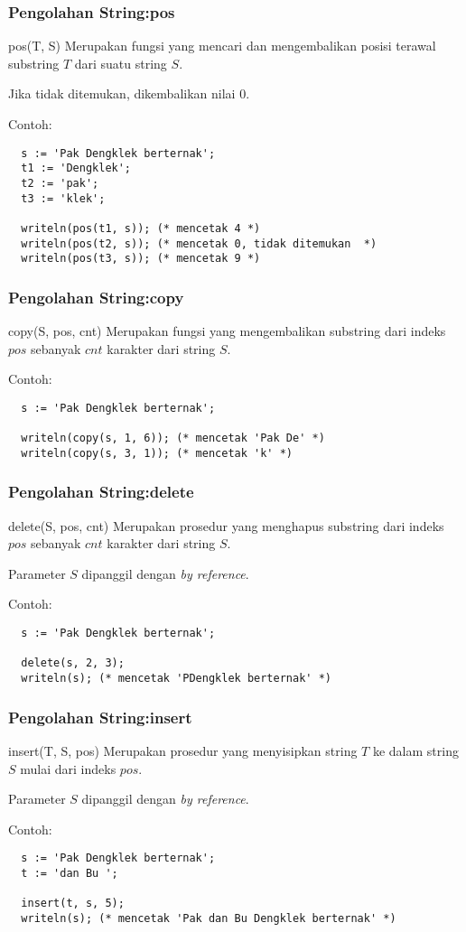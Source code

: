 \documentclass{beamer}
\begin{document}
\begin{frame}[fragile]
\frametitle{Pengolahan String:\newline pos}
\begin{block}{pos(T, S)}
Merupakan fungsi yang mencari dan mengembalikan posisi terawal substring $T$ dari suatu string $S$.

Jika tidak ditemukan, dikembalikan nilai 0.
\end{block}
Contoh:
\begin{lstlisting}
  s := 'Pak Dengklek berternak';
  t1 := 'Dengklek';
  t2 := 'pak';
  t3 := 'klek';

  writeln(pos(t1, s)); (* mencetak 4 *)
  writeln(pos(t2, s)); (* mencetak 0, tidak ditemukan  *)
  writeln(pos(t3, s)); (* mencetak 9 *)
\end{lstlisting}
\end{frame}

\begin{frame}[fragile]
\frametitle{Pengolahan String:\newline copy}
\begin{block}{copy(S, pos, cnt)}
Merupakan fungsi yang mengembalikan substring dari indeks $pos$ sebanyak $cnt$ karakter dari string $S$.
\end{block}
Contoh:
\begin{lstlisting}
  s := 'Pak Dengklek berternak';

  writeln(copy(s, 1, 6)); (* mencetak 'Pak De' *)
  writeln(copy(s, 3, 1)); (* mencetak 'k' *)
\end{lstlisting}
\end{frame}

\begin{frame}[fragile]
\frametitle{Pengolahan String:\newline delete}
\begin{block}{delete(S, pos, cnt)}
Merupakan prosedur yang menghapus substring dari indeks $pos$ sebanyak $cnt$ karakter dari string $S$.

Parameter $S$ dipanggil dengan \textit{by reference}.
\end{block}
Contoh:
\begin{lstlisting}
  s := 'Pak Dengklek berternak';

  delete(s, 2, 3);
  writeln(s); (* mencetak 'PDengklek berternak' *)
\end{lstlisting}
\end{frame}

\begin{frame}[fragile]
\frametitle{Pengolahan String:\newline insert}
\begin{block}{insert(T, S, pos)}
Merupakan prosedur yang menyisipkan string $T$ ke dalam string $S$ mulai dari indeks $pos$.

Parameter $S$ dipanggil dengan \textit{by reference}.
\end{block}
Contoh:
\begin{lstlisting}
  s := 'Pak Dengklek berternak';
  t := 'dan Bu ';

  insert(t, s, 5);
  writeln(s); (* mencetak 'Pak dan Bu Dengklek berternak' *)
\end{lstlisting}
\end{frame}
\end{document}
